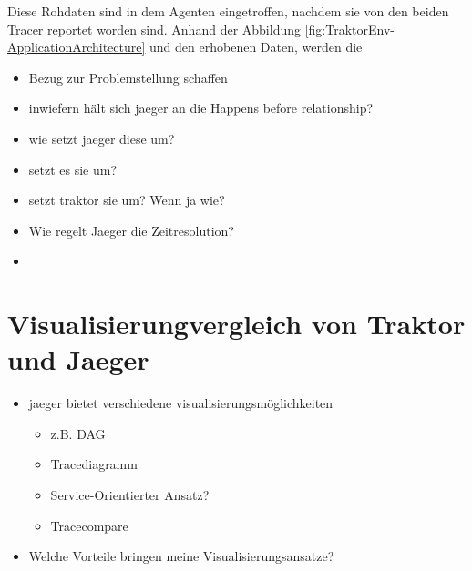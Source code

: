 Diese Rohdaten sind in dem Agenten eingetroffen, nachdem sie von den beiden Tracer reportet worden sind. Anhand der Abbildung \cref{fig:TraktorEnv-ApplicationArchitecture} und den erhobenen Daten, werden die 

\begin{itemize}
	\item Bezug zur Problemstellung schaffen
	\item inwiefern hält sich jaeger an die Happens before relationship?
	\item wie setzt jaeger diese um?
	\item setzt es sie um?
	\item setzt traktor sie um? Wenn ja wie?
	\item Wie regelt Jaeger die Zeitresolution?
	\item  
\end{itemize}
\section{Visualisierungvergleich von Traktor und Jaeger}
\label{section:Visualisierungvergleich von Traktor und Jaeger}
\begin{itemize}
	\item jaeger bietet verschiedene visualisierungsmöglichkeiten
	\begin{itemize}
		\item z.B. DAG
		\item Tracediagramm
		\item Service-Orientierter Ansatz?
		\item Tracecompare
	\end{itemize}
	\item Welche Vorteile bringen meine Visualisierungsansatze?
	
\end{itemize}
